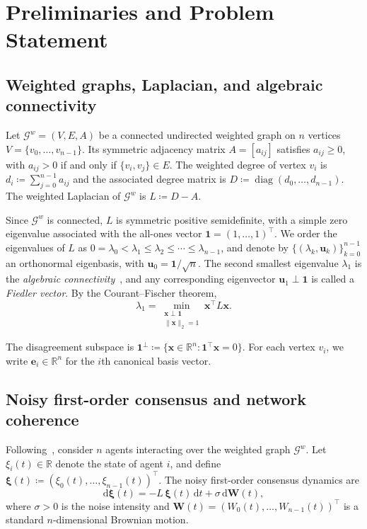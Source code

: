 \documentclass[11pt]{article}
\numberwithin{equation}{section}
\theoremstyle{definition}
\theoremstyle{remark}
\begin{document}
\section{Preliminaries and Problem Statement}
\label{sec:prelim}

\subsection{Weighted graphs, Laplacian, and algebraic connectivity}

Let $\mathcal{G}^{w}=(V,E,A)$ be a connected undirected weighted graph on
$n$ vertices $V=\{v_{0},\dots,v_{n-1}\}$.
Its symmetric adjacency matrix $A=[a_{ij}]$ satisfies $a_{ij}\ge 0$, with
$a_{ij}>0$ if and only if $\{v_i,v_j\}\in E$.
The weighted degree of vertex $v_i$ is $d_i\coloneqq \sum_{j=0}^{n-1} a_{ij}$ and the associated degree matrix is $D\coloneqq \operatorname{diag}(d_0,\dots,d_{n-1})$.
The weighted Laplacian of $\mathcal{G}^{w}$ is $L\coloneqq D-A$.

Since $\mathcal{G}^{w}$ is connected, $L$ is symmetric positive
semidefinite, with a simple zero eigenvalue associated with the all-ones
vector $\boldsymbol{1}=(1,\dots,1)^\top$.
We order the eigenvalues of $L$ as $0=\lambda_0<\lambda_1\le \lambda_2\le \cdots \le \lambda_{n-1}$,
and denote by $\{(\lambda_k,\boldsymbol{u}_k)\}_{k=0}^{n-1}$ an orthonormal
eigenbasis, with $\boldsymbol{u}_0=\boldsymbol{1}/\sqrt{n}$.
The second smallest eigenvalue $\lambda_1$ is the
\emph{algebraic connectivity}~\cite{Fiedler1973}, and any corresponding
eigenvector $\boldsymbol{u}_1\perp \boldsymbol{1}$ is called a
\emph{Fiedler vector}.
By the Courant--Fischer theorem,
\begin{equation}\label{eq:rr_lambda1}
	\lambda_1=
	\min_{\substack{\boldsymbol{x}\perp \boldsymbol{1}\\ \|\boldsymbol{x}\|_2=1}}
	\boldsymbol{x}^\top L \boldsymbol{x}.
\end{equation}

The disagreement subspace is $\boldsymbol{1}^\perp
\coloneqq
\{\boldsymbol{x}\in\mathbb{R}^n:\boldsymbol{1}^\top \boldsymbol{x}=0\}$.
For each vertex $v_i$, we write $\boldsymbol{e}_i\in\mathbb{R}^n$ for the
$i$th canonical basis vector.

\subsection{Noisy first-order consensus and network coherence}

Following~\cite{Bamieh2012}, consider $n$ agents interacting over the
weighted graph $\mathcal{G}^{w}$.
Let $\xi_i(t)\in\mathbb{R}$ denote the state of agent $i$, and define $\boldsymbol{\xi}(t)\coloneqq
(\xi_0(t),\dots,\xi_{n-1}(t))^\top$. The noisy first-order consensus dynamics are
\begin{equation}\label{eq:consensus_sde}
	\mathrm{d}\boldsymbol{\xi}(t)
	=
	-L\,\boldsymbol{\xi}(t)\,\mathrm{d}t
	+
	\sigma\,\mathrm{d}\mathbf{W}(t),
\end{equation}
where $\sigma>0$ is the noise intensity and
$\mathbf{W}(t)=(W_0(t),\dots,W_{n-1}(t))^\top$ is a standard
$n$-dimensional Brownian motion.
\end{document}
